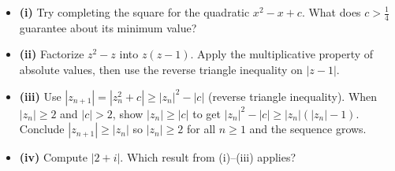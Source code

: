 \begin{hint}
\begin{itemize}
    \item \textbf{(i)} Try completing the square for the quadratic $x^2 - x + c$. What does $c > \frac{1}{4}$ guarantee about its minimum value?
    \item \textbf{(ii)} Factorize $z^2 - z$ into $z(z - 1)$. Apply the multiplicative property of absolute values, then use the reverse triangle inequality on $|z - 1|$.
    \item \textbf{(iii)} Use $|z_{n+1}| = |z_n^2 + c| \ge |z_n|^2 - |c|$ (reverse triangle inequality). When $|z_n| \ge 2$ and $|c| > 2$, show $|z_n| \ge |c|$ to get $|z_n|^2 - |c| \ge |z_n|(|z_n|-1)$. Conclude $|z_{n+1}| \ge |z_n|$ so $|z_n| \ge 2$ for all $n \ge 1$ and the sequence grows.
    \item \textbf{(iv)} Compute $|2 + i|$. Which result from (i)--(iii) applies?
\end{itemize}
\end{hint}

